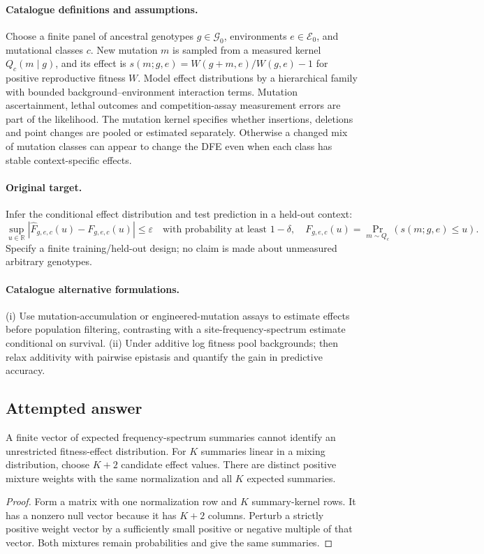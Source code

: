 \documentclass[11pt]{article}
\begin{document}
\paragraph{Catalogue definitions and assumptions.}
Choose a finite panel of ancestral genotypes $g\in\mathcal G_0$, environments $e\in\mathcal E_0$, and mutational classes $c$. New mutation $m$ is sampled from a measured kernel $Q_c(m\mid g)$, and its effect is $s(m;g,e)=W(g+m,e)/W(g,e)-1$ for positive reproductive fitness $W$. Model effect distributions by a hierarchical family with bounded background--environment interaction terms. Mutation ascertainment, lethal outcomes and competition-assay measurement errors are part of the likelihood. The mutation kernel specifies whether insertions, deletions and point changes are pooled or estimated separately. Otherwise a changed mix of mutation classes can appear to change the DFE even when each class has stable context-specific effects.
\paragraph{Original target.}
Infer the conditional effect distribution and test prediction in a held-out context:
\[
 \sup_{u\in\mathbb{R}}
 |\widehat F_{g,e,c}(u)-F_{g,e,c}(u)|\le\varepsilon
 \quad\text{with probability at least }1-\delta,
 \quad F_{g,e,c}(u)=\Pr_{m\sim Q_c}(s(m;g,e)\le u).
\]
Specify a finite training/held-out design; no claim is made about unmeasured arbitrary genotypes.
\paragraph{Catalogue alternative formulations.}
(i) Use mutation-accumulation or engineered-mutation assays to estimate effects before population filtering, contrasting with a site-frequency-spectrum estimate conditional on survival. (ii) Under additive log fitness pool backgrounds; then relax additivity with pairwise epistasis and quantify the gain in predictive accuracy.
\subsection{Attempted answer}
\begin{proposition}
A finite vector of expected frequency-spectrum summaries cannot identify an unrestricted fitness-effect distribution. For $K$ summaries linear in a mixing distribution, choose $K+2$ candidate effect values. There are distinct positive mixture weights with the same normalization and all $K$ expected summaries.
\end{proposition}
\begin{proof}
Form a matrix with one normalization row and $K$ summary-kernel rows. It has a nonzero null vector because it has $K+2$ columns. Perturb a strictly positive weight vector by a sufficiently small positive or negative multiple of that vector. Both mixtures remain probabilities and give the same summaries.
\end{proof}
\end{document}
